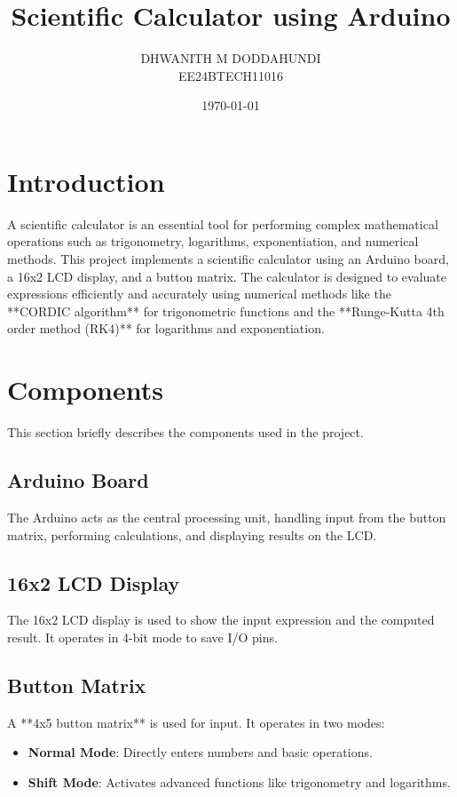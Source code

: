 \documentclass[a4paper,12pt]{article}
\title{\textbf{Scientific Calculator using Arduino}}
\author{DHWANITH M DODDAHUNDI\\EE24BTECH11016}
\date{\today}
\begin{document}
\maketitle

\tableofcontents



\section{Introduction}
A scientific calculator is an essential tool for performing complex mathematical operations such as trigonometry, logarithms, exponentiation, and numerical methods. This project implements a scientific calculator using an Arduino board, a 16x2 LCD display, and a button matrix. The calculator is designed to evaluate expressions efficiently and accurately using numerical methods like the **CORDIC algorithm** for trigonometric functions and the **Runge-Kutta 4th order method (RK4)** for logarithms and exponentiation.

\section{Components}
This section briefly describes the components used in the project.

\subsection{Arduino Board}
The Arduino acts as the central processing unit, handling input from the button matrix, performing calculations, and displaying results on the LCD.

\subsection{16x2 LCD Display}
The 16x2 LCD display is used to show the input expression and the computed result. It operates in 4-bit mode to save I/O pins.

\subsection{Button Matrix}
A **4x5 button matrix** is used for input. It operates in two modes:
\begin{itemize}
    \item \textbf{Normal Mode}: Directly enters numbers and basic operations.
    \item \textbf{Shift Mode}: Activates advanced functions like trigonometry and logarithms.
\end{itemize}
\end{document}
